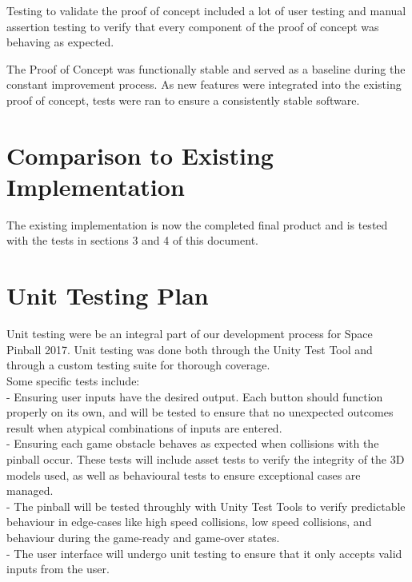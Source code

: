 \documentclass[12pt, titlepage]{article}
\begin{document}
Testing to validate the proof of concept included a lot of user testing and manual assertion testing to verify that every component of the proof of concept was behaving as expected.

The Proof of Concept was functionally stable and served as a baseline during the constant improvement process. As new features were integrated into the existing proof of concept, tests were ran to ensure a consistently stable software.

	
\section{Comparison to Existing Implementation}	
				
The existing implementation is now the completed final product and is tested with the tests in sections 3 and 4 of this document.				
				
\section{Unit Testing Plan}
		

Unit testing were be an integral part of our development process for Space Pinball 2017. Unit testing was done both through the Unity Test Tool and through a custom testing suite for thorough coverage.\\

Some specific tests include:\\

- Ensuring user inputs have the desired output. Each button should function properly on its own, and will be tested to ensure that no unexpected outcomes result when atypical combinations of inputs are entered. \\
- Ensuring each game obstacle behaves as expected when collisions with the pinball occur. These tests will include asset tests to verify the integrity of the 3D models used, as well as behavioural tests to ensure exceptional cases are managed. \\
- The pinball will be tested throughly with Unity Test Tools to verify predictable behaviour in edge-cases like high speed collisions, low speed collisions, and behaviour during the game-ready and game-over states. \\
- The user interface will undergo unit testing to ensure that it only accepts valid inputs from the user. 
		
		
\end{document}
